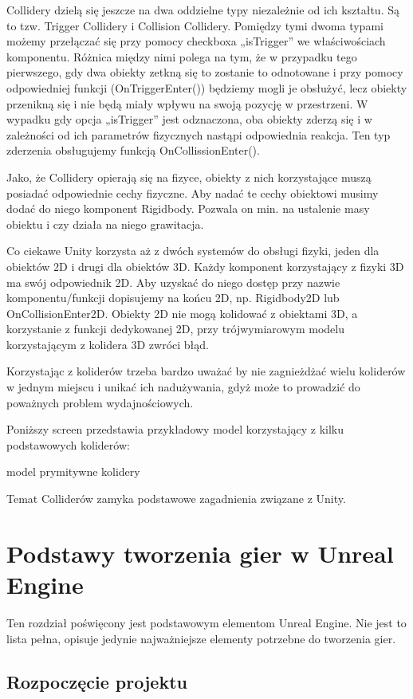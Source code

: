 \documentclass[brudnopis]{xmgr}
\begin{document}
Collidery dzielą się jeszcze na dwa  oddzielne typy niezależnie od ich kształtu. Są to tzw. Trigger Collidery i Collision Collidery. Pomiędzy tymi dwoma typami możemy przełączać się przy pomocy checkboxa „isTrigger” we właściwościach komponentu. Różnica między nimi polega na tym, że w przypadku tego pierwszego, gdy dwa obiekty zetkną się to zostanie to odnotowane i przy pomocy odpowiedniej funkcji (OnTriggerEnter()) będziemy mogli je obsłużyć, lecz obiekty przenikną się i nie będą miały wpływu na swoją pozycję w przestrzeni. W wypadku gdy opcja „isTrigger” jest odznaczona, oba obiekty zderzą się i w zależności od ich parametrów fizycznych nastąpi odpowiednia reakcja. Ten typ zderzenia obsługujemy funkcją OnCollissionEnter().

Jako, że Collidery opierają się na fizyce, obiekty z nich korzystające muszą posiadać odpowiednie cechy fizyczne. Aby nadać te cechy obiektowi musimy dodać do niego komponent Rigidbody. Pozwala on min. na ustalenie masy obiektu i czy działa na niego grawitacja. 

Co ciekawe Unity korzysta aż z dwóch systemów do obsługi fizyki, jeden dla obiektów 2D i drugi dla obiektów 3D. Każdy komponent korzystający z fizyki 3D ma swój odpowiednik 2D. Aby uzyskać do niego dostęp przy nazwie komponentu/funkcji dopisujemy na końcu 2D, np. Rigidbody2D lub OnCollisionEnter2D. Obiekty 2D nie mogą kolidować z obiektami 3D, a korzystanie z funkcji dedykowanej 2D, przy trójwymiarowym modelu korzystającym z kolidera 3D zwróci błąd.

Korzystając z koliderów trzeba bardzo uważać by nie zagnieżdżać wielu koliderów w jednym miejscu i unikać ich nadużywania, gdyż może to prowadzić do poważnych problem wydajnościowych.

Poniższy screen przedstawia przykładowy model korzystający z kilku podstawowych koliderów:

model prymitywne kolidery

Temat Colliderów zamyka podstawowe zagadnienia związane z Unity. 

\chapter{Podstawy tworzenia gier w Unreal Engine}

Ten rozdział poświęcony jest podstawowym elementom Unreal Engine. Nie jest to lista pełna, opisuje jedynie najważniejsze elementy potrzebne do tworzenia gier.

\section{Rozpoczęcie projektu}
\end{document}
